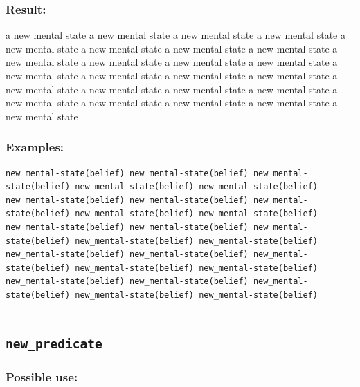 \documentclass[]{book}
\theoremstyle{definition}
\theoremstyle{definition}
\theoremstyle{definition}
\theoremstyle{remark}
\begin{document}
\subsubsection{Result:}\label{result-358}

a new mental state a new mental state a new mental state a new mental
state a new mental state a new mental state a new mental state a new
mental state a new mental state a new mental state a new mental state a
new mental state a new mental state a new mental state a new mental
state a new mental state a new mental state a new mental state a new
mental state a new mental state a new mental state a new mental state a
new mental state a new mental state a new mental state

\subsubsection{Examples:}\label{examples-257}

\begin{verbatim}
new_mental-state(belief) new_mental-state(belief) new_mental-state(belief) new_mental-state(belief) new_mental-state(belief) new_mental-state(belief) new_mental-state(belief) new_mental-state(belief) new_mental-state(belief) new_mental-state(belief) new_mental-state(belief) new_mental-state(belief) new_mental-state(belief) new_mental-state(belief) new_mental-state(belief) new_mental-state(belief) new_mental-state(belief) new_mental-state(belief) new_mental-state(belief) new_mental-state(belief) new_mental-state(belief) new_mental-state(belief) new_mental-state(belief) new_mental-state(belief) new_mental-state(belief) 
\end{verbatim}

\begin{center}\rule{0.5\linewidth}{\linethickness}\end{center}

\subsection{\texorpdfstring{\texttt{new\_predicate}}{new\_predicate}}\label{new_predicate}

\subsubsection{Possible use:}\label{possible-use-371}
\end{document}
